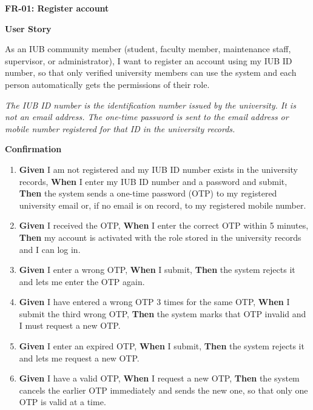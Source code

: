 \noindent\textbf{FR-01: Register account}\par\nopagebreak[4]\smallskip
\noindent\textbf{User Story}\par\nopagebreak[4]
\noindent As an IUB community member (student, faculty member, maintenance staff, supervisor, or administrator), I want to register an account using my IUB ID number, so that only verified university members can use the system and each person automatically gets the permissions of their role.\par\smallskip
\noindent\textit{The IUB ID number is the identification number issued by the university. It is not an email address. The one-time password is sent to the email address or mobile number registered for that ID in the university records.}\par\smallskip
{\makeatletter
{}
\makeatother
\noindent\textbf{Confirmation}\par\nopagebreak[4]\vspace{-6pt}\nopagebreak[4]
\begin{enumerate}\setlength{\itemsep}{2pt}\setlength{\parsep}{0pt}\setlength{\topsep}{2pt}\setlength{\partopsep}{0pt}
  \item \textbf{Given} I am not registered and my IUB ID number exists in the university records, \textbf{When} I enter my IUB ID number and a password and submit, \textbf{Then} the system sends a one-time password (OTP) to my registered university email or, if no email is on record, to my registered mobile number.
  \item \textbf{Given} I received the OTP, \textbf{When} I enter the correct OTP within 5 minutes, \textbf{Then} my account is activated with the role stored in the university records and I can log in.
  \item \textbf{Given} I enter a wrong OTP, \textbf{When} I submit, \textbf{Then} the system rejects it and lets me enter the OTP again.
  \item \textbf{Given} I have entered a wrong OTP 3 times for the same OTP, \textbf{When} I submit the third wrong OTP, \textbf{Then} the system marks that OTP invalid and I must request a new OTP.
  \item \textbf{Given} I enter an expired OTP, \textbf{When} I submit, \textbf{Then} the system rejects it and lets me request a new OTP.
  \item \textbf{Given} I have a valid OTP, \textbf{When} I request a new OTP, \textbf{Then} the system cancels the earlier OTP immediately and sends the new one, so that only one OTP is valid at a time.

\end{enumerate}}
